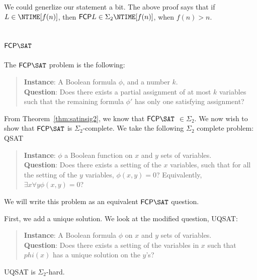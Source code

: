 \documentclass[runningheads,a4paper]{llncs}
\begin{document}
We could generlize our statement a bit. The above proof says that if $L \in \NTIME[f(n)]$, then $\mathsf{FCP} L \in \Sigma_2 \NTIME[f(n)]$, when $f(n) > n$. 

\subsection{$\mathsf{FCP} \SAT$}

The $\mathsf{FCP} \SAT$ problem is the following:
\begin{quote}
\textbf{Instance}: A Boolean formula $\phi$, and a number $k$.\\
\textbf{Question}: Does there exists a partial assignment of at most $k$ variables such that the remaining formula $\phi'$ has only one satisfying assignment?
\end{quote}

From Theorem~\ref{thm:satinsig2}, we know that $\mathsf{FCP} \SAT$ $\in \Sigma_2$. We now wish to show that $\mathsf{FCP} \SAT$ is $\Sigma_2$-complete. We take the following $\Sigma_2$ complete problem: QSAT 
\begin{quote}
\textbf{Instance}: $\phi$ a Boolean function on $x$ and $y$ sets of variables. \\ 
\textbf{Question}: Does there exists a setting of the $x$ variables, such that for all the setting of the $y$ variables, $\phi(x,y) = 0$? Equivalently,$\exists x \forall y \phi(x,y) = 0$?
\end{quote}
We will write this problem as an equivalent $\mathsf{FCP} \SAT$ question.

First, we add a unique solution. We look at the modified question, UQSAT:
\begin{quote} 
\textbf{Instance}: A Boolean formula $\phi$ on $x$ and $y$ sets of variables. \\
\textbf{Question}: Does there exists a setting of the variables in $x$ such that $phi(x)$ has a unique solution on the $y$'s?
\end{quote}

\begin{lemma}
UQSAT is $\Sigma_2$-hard.
\end{lemma}
\end{document}
